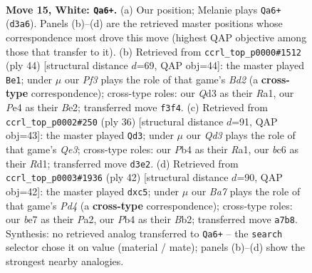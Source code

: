 \documentclass[11pt]{article}
\begin{document}
\clearpage

\begin{figure}[p]\centering
\begin{subfigure}{0.46\textwidth}\centering
\resizebox{\linewidth}{!}{%
\newchessgame
\chessboard[
  setfen={3r3r/Bkp1bppp/1pbpqn2/8/1P2P1P1/2NQ1P2/P1P4P/2KR1B1R w - - 1 15},
  showmover=false,
  pgfstyle=straightmove, color=movearrow, markmove={d3-a6}
]}
\caption{}
\end{subfigure}\hfill
\begin{subfigure}{0.46\textwidth}\centering
\resizebox{\linewidth}{!}{%
\newchessgame
\chessboard[
  setfen={rr1b2k1/5pp1/2qpbn1p/p3p3/4P3/1PNQ3P/2PBBPP1/R2R2K1 w - - 4 23},
  showmover=false,
  pgfstyle=straightmove, color=movearrow, markmove={d2-e1}
]}
\caption{}
\end{subfigure}
\\[4pt]
\begin{subfigure}{0.46\textwidth}\centering
\resizebox{\linewidth}{!}{%
\newchessgame
\chessboard[
  setfen={1r2r1k1/3bppbp/3p1np1/8/pqPB4/2N1Q1PP/PP2PPB1/R2R2K1 w - - 3 19},
  showmover=false,
  pgfstyle=straightmove, color=movearrow, markmove={e3-d3}
]}
\caption{}
\end{subfigure}\hfill
\begin{subfigure}{0.46\textwidth}\centering
\resizebox{\linewidth}{!}{%
\newchessgame
\chessboard[
  setfen={3r1rk1/p3pp1p/1q2b1p1/2p1Pn2/2PP4/1N6/PBR1Q1PP/4R1K1 w - - 0 22},
  showmover=false,
  pgfstyle=straightmove, color=movearrow, markmove={d4-c5}
]}
\caption{}
\end{subfigure}
\caption{\textbf{Move 15, White: \texttt{Qa6+}.} (a) Our position; Melanie plays \texttt{Qa6+} (\texttt{d3a6}). Panels (b)--(d) are the retrieved master positions whose correspondence most drove this move (highest QAP objective among those that transfer to it). (b) Retrieved from \texttt{ccrl\_top\_p0000\#1512} (ply 44) [structural distance $d$=69, QAP obj=44]: the master played \texttt{Be1}; under $\mu$ our \emph{Pf3} plays the role of that game's \emph{Bd2} (a \textbf{cross-type} correspondence); cross-type roles: our \emph{Q}d3 as their \emph{R}a1, our \emph{P}e4 as their \emph{B}e2; transferred move \texttt{f3f4}. (c) Retrieved from \texttt{ccrl\_top\_p0002\#250} (ply 36) [structural distance $d$=91, QAP obj=43]: the master played \texttt{Qd3}; under $\mu$ our \emph{Qd3} plays the role of that game's \emph{Qe3}; cross-type roles: our \emph{P}b4 as their \emph{R}a1, our \emph{b}c6 as their \emph{R}d1; transferred move \texttt{d3e2}. (d) Retrieved from \texttt{ccrl\_top\_p0003\#1936} (ply 42) [structural distance $d$=90, QAP obj=42]: the master played \texttt{dxc5}; under $\mu$ our \emph{Ba7} plays the role of that game's \emph{Pd4} (a \textbf{cross-type} correspondence); cross-type roles: our \emph{b}e7 as their \emph{P}a2, our \emph{P}b4 as their \emph{B}b2; transferred move \texttt{a7b8}. Synthesis: no retrieved analog transferred to \texttt{Qa6+} -- the \texttt{search} selector chose it on value (material / mate); panels (b)--(d) show the strongest nearby analogies.}
\label{fig:thought-m28}
\end{figure}
\end{document}
